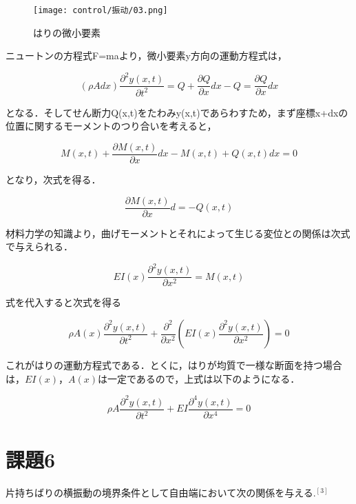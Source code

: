 \documentclass[xelatex,ja=standard,jafont=noto]{bxjsarticle}
\begin{document}
\begin{figure}[h!]
    \centering
    \texttt{[image: control/振动/03.png]}
    \caption{はりの微小要素}
\end{figure}



ニュートンの方程式F=maより，微小要素y方向の運動方程式は，

\begin{equation}
			(\rho Adx)\frac{\partial^{2}y(x,t)}{\partial t^{2}}=Q+\frac{\partial Q}{\partial x}dx-Q=\frac{\partial Q}{\partial x}dx
\end{equation}

となる．そしてせん断力Q(x,t)をたわみy(x,t)であらわすため，まず座標x+dxの位置に関するモーメントのつり合いを考えると，


\begin{equation}
			M(x,t)+\frac{\partial M(x,t)}{\partial x}dx-M(x,t)+Q(x,t)dx=0
\end{equation}

となり，次式を得る．


\begin{equation}
			\frac{\partial M(x,t)}{\partial x}d=-Q(x,t)
\end{equation}


材料力学の知識より，曲げモーメントとそれによって生じる変位との関係は次式で与えられる．


\begin{equation}
			EI(x)\frac{{\partial^{2}y(x,t)}}{\partial x^{2}}=M(x,t)
\end{equation}


式を代入すると次式を得る


\begin{equation}
			\rho A(x)\frac{\partial^{2}y(x,t)}{\partial t^{2}}+\frac{\partial^{2}}{\partial x^{2}} (EI(x)\frac{\partial^{2}y(x,t)}{\partial x^{2}})=0
\end{equation}


これがはりの運動方程式である．とくに，はりが均質で一様な断面を持つ場合は，$ EI(x)，A(x) $は一定であるので，上式は以下のようになる．


\begin{equation}
			\rho A\frac{\partial^{2}y(x,t)}{\partial t^{2}}+EI\frac{\partial^{4}y(x,t)}{\partial x^{4}}=0
\end{equation}


\newpage



\section{課題6}
片持ちばりの横振動の境界条件として自由端において次の関係を与える.$ ^{[3]} $
\end{document}
